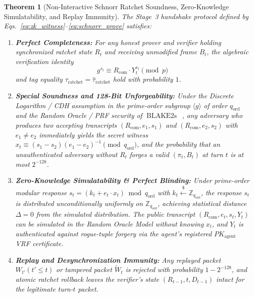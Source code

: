\documentclass[conference,10pt]{IEEEtran}
\newtheorem{theorem}{Theorem}
\begin{document}
\begin{theorem}[Non-Interactive Schnorr Ratchet Soundness, Zero-Knowledge Simulatability, and Replay Immunity]
\label{thm:schnorr}
The Stage~3 handshake protocol defined by Eqs.~\eqref{eq:zk_witness}--\eqref{eq:schnorr_prove} satisfies:
\begin{enumerate}
    \item \textbf{Perfect Completeness:} For any honest prover and verifier holding synchronized ratchet state $R_t$ and receiving unmodified frame $B_t$, the algebraic verification identity
    \begin{equation}
    \label{eq:schnorr_verify}
    g^{s_t} \equiv R_{\text{com}} \cdot Y_t^{e_t} \pmod p
    \end{equation}
    and tag equality $\tau_{\text{ratchet}} = \hat{\tau}_{\text{ratchet}}$ hold with probability $1$.
    \item \textbf{Special Soundness and 128-Bit Unforgeability:} Under the Discrete Logarithm / CDH assumption in the prime-order subgroup $\langle g \rangle$ of order $q_{\text{ord}}$ and the Random Oracle / PRF security of $\operatorname{BLAKE2s}$~\cite{bellare1993random, pointcheval2000security}, any adversary who produces two accepting transcripts $(R_{\text{com}}, e_1, s_1)$ and $(R_{\text{com}}, e_2, s_2)$ with $e_1 \ne e_2$ immediately yields the secret witness $x_t \equiv (s_1 - s_2)(e_1 - e_2)^{-1} \pmod{q_{\text{ord}}}$, and the probability that an unauthenticated adversary without $R_t$ forges a valid $(\pi_t, B_t)$ at turn $t$ is at most $2^{-128}$.
    \item \textbf{Zero-Knowledge Simulatability \& Perfect Blinding:} Under prime-order modular response $s_t = (k_t + e_t \cdot x_t) \bmod q_{\text{ord}}$ with $k_t \xleftarrow{\$} \mathbb{Z}_{q_{\text{ord}}}$, the response $s_t$ is distributed unconditionally uniformly on $\mathbb{Z}_{q_{\text{ord}}}$, achieving statistical distance $\Delta = 0$ from the simulated distribution. The public transcript $(R_{\text{com}}, e_t, s_t, Y_t)$ can be simulated in the Random Oracle Model without knowing $x_t$, and $Y_t$ is authenticated against rogue-tuple forgery via the agent's registered $PK_{\text{agent}}$ VRF certificate.
    \item \textbf{Replay and Desynchronization Immunity:} Any replayed packet $W_{t'} (t' \le t)$ or tampered packet $\tilde{W}_t$ is rejected with probability $1 - 2^{-128}$, and atomic ratchet rollback leaves the verifier's state $(R_{t-1}, t, D_{t-1})$ intact for the legitimate turn-$t$ packet.
\end{enumerate}
\end{theorem}
\end{document}
